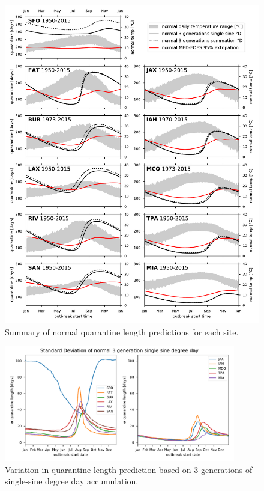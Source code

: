 \documentclass[10pt,a4paper,twocolumn]{article}
\begin{document}
\begin{figure}
\centering
\includegraphics[width=1\textwidth]{figs/fig_main.pdf}
\caption{\label{fig:main_summary}Summary of normal quarantine length predictions for each site.}
\end{figure}

\begin{figure}
\centering
\includegraphics[width=0.9\textwidth]{figs/fig_BMDD_variation.pdf}
\caption{\label{fig:DD_variation_summary}Variation in quarantine length prediction 
based on 3 generations of single-sine degree day accumulation.}
\end{figure}
\end{document}
